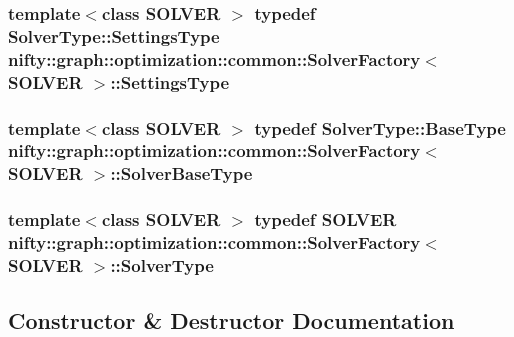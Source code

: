 \subsubsection[{Settings\+Type}]{\setlength{\rightskip}{0pt plus 5cm}template$<$class S\+O\+L\+V\+E\+R $>$ typedef Solver\+Type\+::\+Settings\+Type {\bf nifty\+::graph\+::optimization\+::common\+::\+Solver\+Factory}$<$ S\+O\+L\+V\+E\+R $>$\+::{\bf Settings\+Type}}\label{classnifty_1_1graph_1_1optimization_1_1common_1_1SolverFactory_acb8bf1b9189609a018ee99c2eb3216d9}
\hypertarget{classnifty_1_1graph_1_1optimization_1_1common_1_1SolverFactory_a8e00f6151223974eb0e48236023451d2}{}
\subsubsection[{Solver\+Base\+Type}]{\setlength{\rightskip}{0pt plus 5cm}template$<$class S\+O\+L\+V\+E\+R $>$ typedef Solver\+Type\+::\+Base\+Type {\bf nifty\+::graph\+::optimization\+::common\+::\+Solver\+Factory}$<$ S\+O\+L\+V\+E\+R $>$\+::{\bf Solver\+Base\+Type}}\label{classnifty_1_1graph_1_1optimization_1_1common_1_1SolverFactory_a8e00f6151223974eb0e48236023451d2}
\hypertarget{classnifty_1_1graph_1_1optimization_1_1common_1_1SolverFactory_a76aeead4fe93c3973e6c82a38cb898b7}{}
\subsubsection[{Solver\+Type}]{\setlength{\rightskip}{0pt plus 5cm}template$<$class S\+O\+L\+V\+E\+R $>$ typedef S\+O\+L\+V\+E\+R {\bf nifty\+::graph\+::optimization\+::common\+::\+Solver\+Factory}$<$ S\+O\+L\+V\+E\+R $>$\+::{\bf Solver\+Type}}\label{classnifty_1_1graph_1_1optimization_1_1common_1_1SolverFactory_a76aeead4fe93c3973e6c82a38cb898b7}


\subsection{Constructor \& Destructor Documentation}
\hypertarget{classnifty_1_1graph_1_1optimization_1_1common_1_1SolverFactory_aea16c2fe5e3c8e1a1f23b964e1b2b7cd}{}
